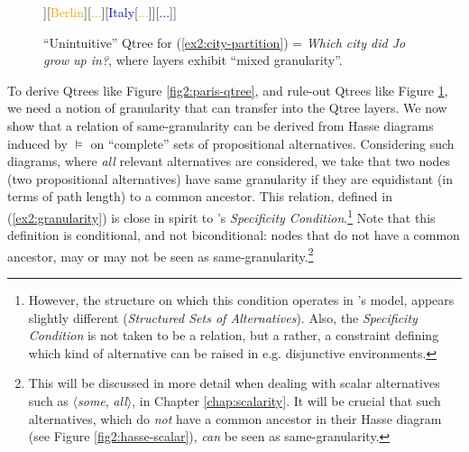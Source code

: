\begin{figure}[H]
	\centering
		\begin{forest}
			[{CS\\
				Jo grew up in...}[\textcolor{blue}{France}[\textcolor{orange}{{\fbox{Paris}}}][\textcolor{orange}{Lyon}][\textcolor{orange}{...}]][\textcolor{orange}{Berlin}][\textcolor{orange}{...}][\textcolor{blue}{Italy}[\textcolor{orange}{...}]][\textcolor{blue}{...}]]
		\end{forest}
		\caption{``Unintuitive'' Qtree for (\ref{ex2:city-partition}) = \textit{Which city did Jo grow up in?}, where layers exhibit ``mixed granularity''.}\label{fig2:paris-qtree-mixed}
	\end{figure}

To derive Qtrees like Figure \ref{fig2:paris-qtree}, and rule-out Qtrees like Figure \ref{fig2:paris-qtree-mixed}, we need a notion of granularity that can transfer into the Qtree layers. We now show that a relation of same-granularity can be derived from Hasse diagrams induced by $\vDash$ on ``complete'' sets of propositional alternatives. Considering such diagrams, where \textit{all} relevant alternatives are considered, we take that two nodes (two propositional alternatives) have same granularity if they are equidistant (in terms of path length) to a common ancestor. This relation, defined in (\ref{ex2:granularity}) is close in spirit to \citet{Ippolito2019}'s \textit{Specificity Condition}.\footnote{However, the structure on which this condition operates in \citeauthor{Ippolito2019}'s model, appears slightly different (\textit{Structured Sets of Alternatives}). Also, the \textit{Specificity Condition} is not taken to be a relation, but a rather, a constraint defining which kind of alternative can be raised in e.g. disjunctive environments.} Note that this definition is conditional, and not biconditional: nodes that do not have a common ancestor, may or may not be seen as same-granularity.\footnote{This will be discussed in more detail when dealing with scalar alternatives such as $\langle$\textit{some}, \textit{all}$\rangle$, in Chapter \ref{chap:scalarity}. It will be crucial that such alternatives, which do \textit{not} have a common ancestor in their Hasse diagram (see Figure \ref{fig2:hasse-scalar}), \textit{can} be seen as same-granularity.}

\begin{exe}
	\label{ex2:granularity}
\end{exe}

